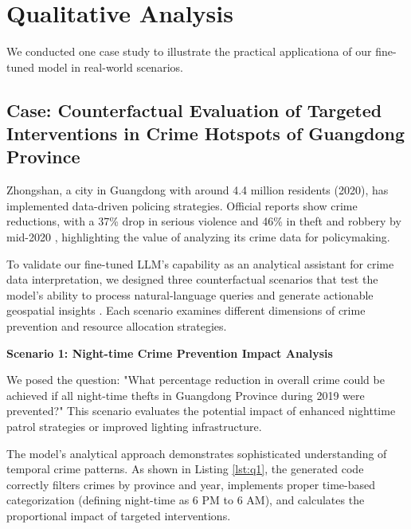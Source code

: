 \section{Qualitative Analysis}

We conducted one case study to illustrate the practical applicationa of our fine-tuned model in real-world scenarios. 


\subsection{Case: Counterfactual Evaluation of Targeted Interventions in Crime Hotspots of Guangdong Province}

Zhongshan, a city in Guangdong with around 4.4 million residents (2020), has implemented data-driven policing strategies. Official reports show crime reductions, with a 37\% drop in serious violence and 46\% in theft and robbery by mid-2020 \cite{Zhongshan2020}, highlighting the value of analyzing its crime data for policymaking.

To validate our fine-tuned LLM's capability as an analytical assistant for crime data interpretation, we designed three counterfactual scenarios that test the model's ability to process natural-language queries and generate actionable geospatial insights \cite{William2025}. Each scenario examines different dimensions of crime prevention and resource allocation strategies.



\noindent \textbf{Scenario 1: Night-time Crime Prevention Impact Analysis}

We posed the question: "What percentage reduction in overall crime could be achieved if all night-time thefts in Guangdong Province during 2019 were prevented?" This scenario evaluates the potential impact of enhanced nighttime patrol strategies or improved lighting infrastructure.

The model's analytical approach demonstrates sophisticated understanding of temporal crime patterns. As shown in Listing \ref{lst:q1}, the generated code correctly filters crimes by province and year, implements proper time-based categorization (defining night-time as 6 PM to 6 AM), and calculates the proportional impact of targeted interventions.



